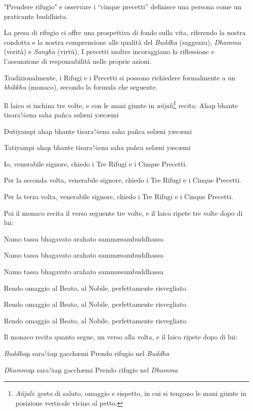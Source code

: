 

"Prendere rifugio" e osservare i “cinque precetti” definisce una persona
come un praticante buddhista.

La presa di rifugio ci offre una prospettiva di fondo sulla vita,
riferendo la nostra condotta e la nostra comprensione alle qualità del
\textit{Buddha} (saggezza), \textit{Dhamma} (verità) e \textit{Sangha} (virtù). I precetti inoltre
incoraggiano la riflessione e l'assunzione di responsabilità nelle
proprie azioni.

Tradizionalmente, i Rifugi e i Precetti si possono richiedere
formalmente a un \textit{bhikkhu} (monaco), secondo la formula che seguente.

Il laico si inchina tre volte, e con le mani giunte in
\textit{añjali}\footnote{\textit{Añjali}: gesto di saluto, omaggio e rispetto, in cui si
tengono le mani giunte in posizione verticale vicino al petto.} recita:
Ahaµ bhante tisara¼ena saha pañca sølæni yæcæmi

Dutiyampi ahaµ bhante tisara¼ena saha pañca sølæni yæcæmi

Tatiyampi ahaµ bhante tisara¼ena saha pañca sølæni yæcæmi

Io, venerabile signore, chiedo i Tre Rifugi e i Cinque Precetti.

Per la seconda volta, venerabile signore, chiedo i Tre Rifugi e i Cinque
Precetti.

Per la terza volta, venerabile signore, chiedo i Tre Rifugi e i Cinque
Precetti.

Poi il monaco recita il verso seguente tre volte, e il laico ripete tre
volte dopo di lui:

Namo tassa bhagavato arahato sammæsambuddhassa

Namo tassa bhagavato arahato sammæsambuddhassa

Namo tassa bhagavato arahato sammæsambuddhassa

Rendo omaggio al Beato, al Nobile, perfettamente risvegliato.

Rendo omaggio al Beato, al Nobile, perfettamente risvegliato.

Rendo omaggio al Beato, al Nobile, perfettamente risvegliato.

Il monaco recita quanto segue, un verso alla volta, e il laico ripete
dopo di lui:

\textit{Buddha}µ sara¼aµ gacchæmi Prendo rifugio nel \textit{Buddha}

\textit{Dhamma}µ sara¼aµ gacchæmi Prendo rifugio nel \textit{Dhamma}

